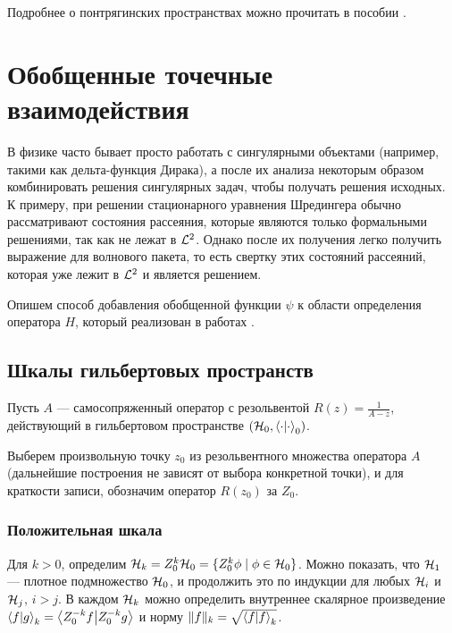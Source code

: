 Подробнее о понтрягинских пространствах можно прочитать в пособии \cite{azizov_pontryagin}.

\section{Обобщенные точечные взаимодействия}
В физике часто бывает просто работать с сингулярными объектами (например, такими как дельта-функция Дирака), а после их анализа некоторым образом комбинировать решения сингулярных задач, чтобы получать решения исходных. К примеру, при решении стационарного уравнения Шредингера обычно рассматривают состояния рассеяния, которые являются только формальными решениями, так как не лежат в $\mathcal{L}^2$. Однако после их получения легко получить выражение для волнового пакета, то есть свертку этих состояний рассеяний, которая уже лежит в $\mathcal{L}^2$ и является решением.

Опишем способ добавления обобщенной функции $\psi$ к области определения оператора $H$, который реализован в работах \cite{van1991scattering, dijksma2000self, dijksma2000singular}.

\subsection{Шкалы гильбертовых пространств}
Пусть $A$ — самосопряженный оператор с резольвентой $R(z) = \frac{1}{A - z}$, действующий в гильбертовом пространстве $(\hilb{0}, \ipcdot_0)$.

Выберем произвольную точку $z_0$ из резольвентного множества оператора $A$ (дальнейшие построения не зависят от выбора конкретной точки), и для краткости записи, обозначим оператор $R(z_0)$ за $Z_0$.

\subsubsection{Положительная шкала}
Для $k > 0$, определим $\mathcal{H}_{k} = Z_0^k \mathcal{H}_{0} = \{ Z_0^k \phi \mid \phi \in \mathcal{H}_{0} \}$. Можно показать, что $\mathcal{H}_{1}$ — плотное подмножество $\mathcal{H}_{0}$, и продолжить это по индукции для любых $\mathcal{H}_{i}$ и $\mathcal{H}_{j}$, $i > j$. В каждом $\mathcal{H}_{k}$ можно определить внутреннее скалярное произведение $\ip{f}{g}_k = \ip{Z_0^{-k} f}{Z_0^{-k} g}$ и норму $\|f\|_k = \sqrt{\ip{f}{f}_k}$.

